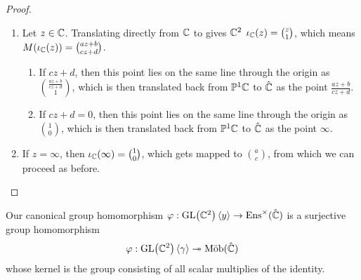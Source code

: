 \begin{proof}
	\begin{enumerate}
		\item Let $z \in \mathbb{C}$. Translating directly from $\mathbb{C}$ to gives $\mathbb{C}^2$ $\iota_{\mathbb{C}}(z) = \binom{z}{1}$, which means $M(\iota_{\mathbb{C}}(z)) = \binom{az + b}{cz + d}$. 
		\begin{enumerate}
			\item If $cz + d$, then this point lies on the same line through the origin as $\binom{\frac{az + b}{cz + d}}{1}$, which is then translated back from $\mathbb{P}^1 \mathbb{C}$ to $\hat {\mathbb{C}}$ as the point $\frac{az + b}{cz + d}$.
			\item If $cz + d = 0$, then this point lies on the same line through the origin as $\binom{1}{0}$, which is then translated back from $\mathbb{P}^1 \mathbb{C}$ to $\hat {\mathbb{C}}$ as the point $\infty$.
		\end{enumerate}
		\item If $z = \infty$, then $\iota_{\mathbb{C}}(\infty) = \binom{1}{0}$, which gets mapped to $\binom{a}{c}$, from which we can proceed as before.
	\end{enumerate}
\end{proof}
\begin{theorem} 
	Our canonical group homomorphism $\varphi : \textnormal{GL}\qty(\mathbb{C}^2)\left\langle y \right\rangle \to \textnormal{Ens}^\times(\hat {\mathbb{C}})$ is a surjective group homomorphism
	\begin{align*}
		\varphi : \textnormal{GL}\qty(\mathbb{C}^2)\left\langle \gamma \right\rangle \twoheadrightarrow \textnormal{Möb}(\hat {\mathbb{C}})
	\end{align*}
	whose kernel is the group consisting of all scalar multiplies of the identity.
\end{theorem}
